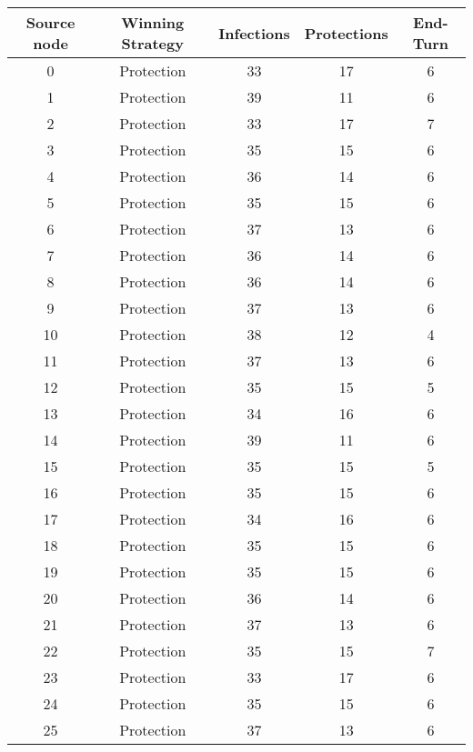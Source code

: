 \documentclass[results.tex]{subfiles}
\begin{document}
\begin{center}
  \begin{tabular}{| c || c | c | c | c |}
    \hline
    {\bfseries Source node} & {\bfseries Winning Strategy} & {\bfseries Infections} & {\bfseries Protections} & {\bfseries End-Turn} \\  %
    \hline\hline
    0 & Protection & 33 & 17 & 6 \\ 
    \hline
    1 & Protection & 39 & 11 & 6 \\ 
    \hline
    2 & Protection & 33 & 17 & 7 \\ 
    \hline
    3 & Protection & 35 & 15 & 6 \\ 
    \hline
    4 & Protection & 36 & 14 & 6 \\ 
    \hline
    5 & Protection & 35 & 15 & 6 \\ 
    \hline
    6 & Protection & 37 & 13 & 6 \\ 
    \hline
    7 & Protection & 36 & 14 & 6 \\ 
    \hline
    8 & Protection & 36 & 14 & 6 \\ 
    \hline
    9 & Protection & 37 & 13 & 6 \\ 
    \hline
    10 & Protection & 38 & 12 & 4 \\ 
    \hline
    11 & Protection & 37 & 13 & 6 \\ 
    \hline
    12 & Protection & 35 & 15 & 5 \\ 
    \hline
    13 & Protection & 34 & 16 & 6 \\ 
    \hline
    14 & Protection & 39 & 11 & 6 \\ 
    \hline
    15 & Protection & 35 & 15 & 5 \\ 
    \hline
    16 & Protection & 35 & 15 & 6 \\ 
    \hline
    17 & Protection & 34 & 16 & 6 \\ 
    \hline
    18 & Protection & 35 & 15 & 6 \\ 
    \hline
    19 & Protection & 35 & 15 & 6 \\ 
    \hline
    20 & Protection & 36 & 14 & 6 \\ 
    \hline
    21 & Protection & 37 & 13 & 6 \\ 
    \hline
    22 & Protection & 35 & 15 & 7 \\ 
    \hline
    23 & Protection & 33 & 17 & 6 \\ 
    \hline
    24 & Protection & 35 & 15 & 6 \\ 
    \hline
    25 & Protection & 37 & 13 & 6 \\ 

\end{tabular}
\end{center}
\end{document}
